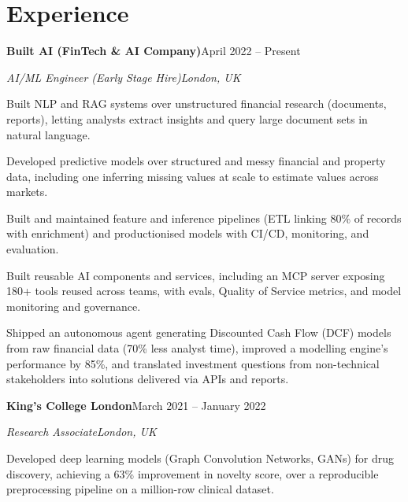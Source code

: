 \documentclass[10pt,a4paper]{article}
\newcommand{\entry}[4]{%
  {\color{company}\bfseries #1}\hfill {\color{muted}#2}\par
  \vspace{1pt}
  {\itshape #3}\hfill {\color{muted}\itshape #4}\par
  \vspace{3pt}%
}
\begin{document}
\section{Experience}
\entry{Built AI (FinTech \& AI Company)}{April 2022 -- Present}{AI/ML Engineer (Early Stage Hire)}{London, UK}
\begin{tight}
  \item Built NLP and RAG systems over unstructured financial research (documents, reports), letting analysts extract insights and query large document sets in natural language.
  \item Developed predictive models over structured and messy financial and property data, including one inferring missing values at scale to estimate values across markets.
  \item Built and maintained feature and inference pipelines (ETL linking 80\% of records with enrichment) and productionised models with CI/CD, monitoring, and evaluation.
  \item Built reusable AI components and services, including an MCP server exposing 180+ tools reused across teams, with evals, Quality of Service metrics, and model monitoring and governance.
  \item Shipped an autonomous agent generating Discounted Cash Flow (DCF) models from raw financial data (70\% less analyst time), improved a modelling engine's performance by 85\%, and translated investment questions from non-technical stakeholders into solutions delivered via APIs and reports.
\end{tight}

\entry{King's College London}{March 2021 -- January 2022}{Research Associate}{London, UK}
\begin{tight}
  \item Developed deep learning models (Graph Convolution Networks, GANs) for drug discovery, achieving a 63\% improvement in novelty score, over a reproducible preprocessing pipeline on a million-row clinical dataset.
\end{tight}

\end{document}
